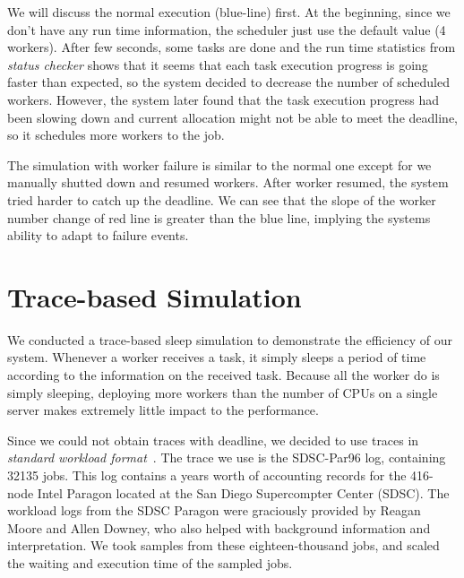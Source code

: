 We will discuss the normal execution (blue-line) first.
At the beginning, since we don't have any run time information, the
scheduler just use the default value (4 workers).
After few seconds, some tasks are done and the run time statistics from
\emph{status checker} shows that it seems that each task execution
progress is going faster than expected, so the system decided to
decrease the number of scheduled workers.
However, the system later found that the task execution progress had
been slowing down and current allocation might not be able to meet the
deadline, so it schedules more workers to the job.

The simulation with worker failure is similar to the normal one except
for we manually shutted down and resumed workers.
After worker resumed, the system tried harder to catch up the deadline.
We can see that the slope of the worker number change of red line is
greater than the blue line, implying the systems ability to adapt to
failure events.

\section{Trace-based Simulation}

We conducted a trace-based sleep simulation to demonstrate the
efficiency of our system.
Whenever a worker receives a task, it simply sleeps a period of time
according to the information on the received task.
Because all the worker do is simply sleeping, deploying more workers
than the number of CPUs on a single server makes extremely little impact
to the performance.

Since we could not obtain traces with deadline, we decided to use traces
in \emph{standard workload format}~\cite{cite:swf}.
The trace we use is the SDSC-Par96 log, containing 32135 jobs.
This log contains a years worth of accounting records for the 416-node
Intel Paragon located at the San Diego Supercompter Center (SDSC).
The workload logs from the SDSC Paragon were graciously provided by
Reagan Moore and Allen Downey, who also helped with background
information and interpretation.
We took samples from these eighteen-thousand jobs, and scaled the
waiting and execution time of the sampled jobs.

